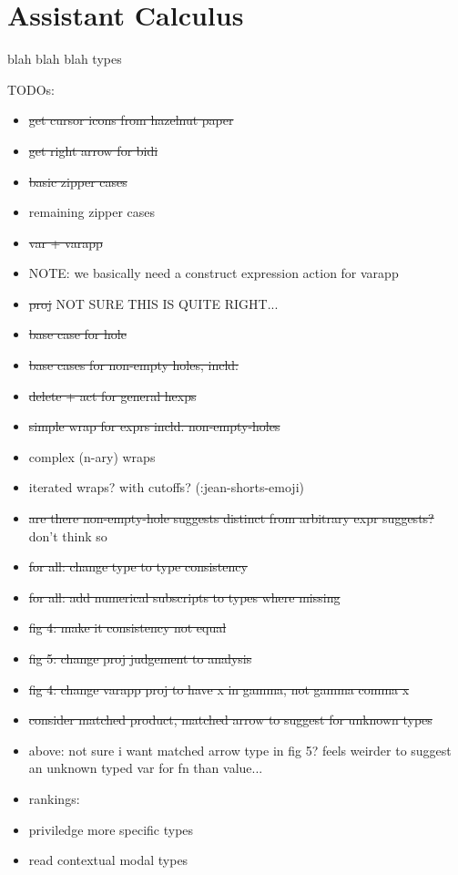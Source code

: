 \section{Assistant Calculus}\label{sec:assistant-calculus}

blah blah blah types

TODOs:
\begin{itemize}
    \item \sout{get cursor icons from hazelnut paper}
    \item \sout{get right arrow for bidi}
    \item \sout{basic zipper cases}
    \item remaining zipper cases
    \item \sout{var + varapp}
    \item NOTE: we basically need a construct expression action for varapp
    \item \sout{proj} NOT SURE THIS IS QUITE RIGHT...
    \item \sout{base case for hole}
    \item \sout{base cases for non-empty holes, incld:}
    \item \sout{delete + act for general hexps}
    \item \sout{simple wrap for exprs incld. non-empty-holes}
    \item complex (n-ary) wraps
    \item iterated wraps? with cutoffs? (:jean-shorts-emoji)
    \item \sout{are there non-empty-hole suggests distinct from arbitrary expr suggests?} don't think so
    \item \sout{for all: change type to type consistency}
    \item \sout{for all: add numerical subscripts to types where missing}
    \item \sout{fig 4: make it consistency not equal}
    \item \sout{fig 5: change proj judgement to analysis}
    \item \sout{fig 4: change varapp proj to have x in gamma, not gamma comma x}
    \item \sout{consider matched product, matched arrow to suggest for unknown types}
    \item above: not sure i want matched arrow type in fig 5? feels weirder to suggest an unknown typed var for fn than value...
    \item rankings:
    \item priviledge more specific types
    \item read contextual modal types
\end{itemize}

